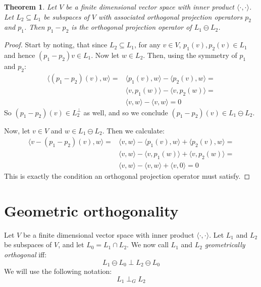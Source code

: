 \documentclass[12pt, a4paper]{article}
\newtheorem{theorem}{Theorem}[section]
\numberwithin{equation}{section}
\begin{document}
\begin{theorem}
\label{projection_lemma3}
Let $V$ be a finite dimensional vector space with inner product $\langle\cdot,\cdot\rangle$. Let $L_2\subseteq L_1$ be subspaces of $V$ with associated orthogonal projection operators $p_2$ and $p_1$. Then $p_1-p_2$ is the orthogonal projection operator of $L_1\ominus L_2$.
\end{theorem}
\begin{proof}
Start by noting, that since $L_2\subseteq L_1$, for any $v\in V$, $p_1(v),p_2(v)\in L_1$ and hence $(p_1-p_2)v\in L_1$. Now let $w\in L_2$. Then, using the symmetry of $p_1$ and $p_2$:
\begin{align}
\langle(p_1-p_2)(v),w\rangle=&\langle p_1(v),w\rangle-\langle p_2(v),w\rangle=\\
&\langle v,p_1(w)\rangle-\langle v,p_2(w)\rangle=\\
&\langle v,w\rangle-\langle v,w\rangle=0
\end{align}
So $(p_1-p_2)(v)\in L_2^\perp$ as well, and so we conclude $(p_1-p_2)(v)\in L_1\ominus L_2$.

Now, let $v\in V$ and $w\in L_1\ominus L_2$. Then we calculate:
\begin{align}
\langle v-(p_1-p_2)(v),w\rangle=&\langle v,w\rangle-\langle p_1(v),w\rangle+\langle p_2(v),w\rangle=\\
&\langle v,w\rangle-\langle v,p_1(w)\rangle+\langle v,p_2(w)\rangle=\\
&\langle v,w\rangle-\langle v,w\rangle+\langle v,0\rangle=0
\end{align}
This is exactly the condition an orthogonal projection operator must satisfy.
\end{proof}

\section{Geometric orthogonality}
Let $V$ be a finite dimensional vector space with inner product $\langle\cdot,\cdot\rangle$. Let $L_1$ and $L_2$ be subspaces of $V$, and let $L_0=L_1\cap L_2$. We now call $L_1$ and $L_2$ \textit{geometrically orthogonal} iff:
\begin{equation}
L_1\ominus L_0\perp L_2\ominus L_0
\end{equation}
We will use the following notation:
\begin{equation}
L_1\perp_G L_2
\end{equation}
\end{document}
